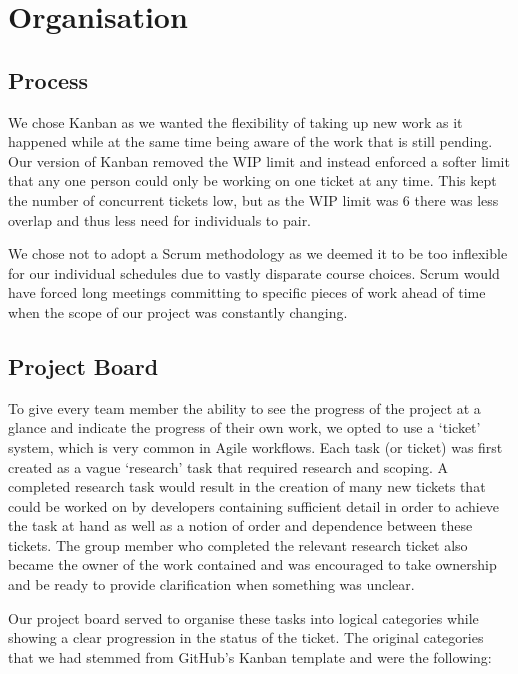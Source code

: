 \section{Organisation}

\subsection{Process}

We chose Kanban as we wanted the flexibility of taking up new work as it happened while at the same time being aware of the work that is still pending. Our version of Kanban removed the WIP limit and instead enforced a softer limit that any one person could only be working on one ticket at any time. This kept the number of concurrent tickets low, but as the WIP limit was 6 there was less overlap and thus less need for individuals to pair. 

We chose not to adopt a Scrum methodology as we deemed it to be too inflexible for our individual schedules due to vastly disparate course choices. Scrum would have forced long meetings committing to specific pieces of work ahead of time when the scope of our project was constantly changing.

\subsection{Project Board}

To give every team member the ability to see the progress of the project at a glance and indicate the progress of their own work, we opted to use a `ticket' system, which is very common in Agile workflows. Each task (or ticket) was first created as a vague `research' task that required research and scoping. A completed research task would result in the creation of many new tickets that could be worked on by developers containing sufficient detail in order to achieve the task at hand as well as a notion of order and dependence between these tickets. The group member who completed the relevant research ticket also became the owner of the work contained and was encouraged to take ownership and be ready to provide clarification when something was unclear.

Our project board served to organise these tasks into logical categories while showing a clear progression in the status of the ticket. The original categories that we had stemmed from GitHub's Kanban template and were the following:

\begin{figure}[H]
\centering
{}
\end{figure}

